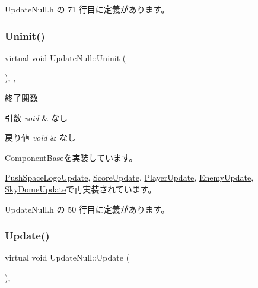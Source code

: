  Update\+Null.\+h の 71 行目に定義があります。

\mbox{\label{class_update_null_a5bd107431c5039abe13c966edb047375}} 
\subsubsection{\texorpdfstring{Uninit()}{Uninit()}}
{\footnotesize\ttfamily virtual void Update\+Null\+::\+Uninit (\begin{DoxyParamCaption}{ }\end{DoxyParamCaption})\hspace{0.3cm}{\ttfamily [inline]}, {\ttfamily [override]}, {\ttfamily [virtual]}}



終了関数 


\begin{DoxyParams}{引数}
{\em void} & なし \\
\hline
\end{DoxyParams}

\begin{DoxyRetVals}{戻り値}
{\em void} & なし \\
\hline
\end{DoxyRetVals}


\mbox{\hyperlink{class_component_base_a9f42beaf0383d6f629819579cab4de57}{Component\+Base}}を実装しています。



\mbox{\hyperlink{class_push_space_logo_update_a94f791874cb6160cd33cd7068fcde0d0}{Push\+Space\+Logo\+Update}}, \mbox{\hyperlink{class_score_update_a701d9c84c3ef92b1c54f33b37e23605f}{Score\+Update}}, \mbox{\hyperlink{class_player_update_a997e0813a825d7525da4b5b89a290168}{Player\+Update}}, \mbox{\hyperlink{class_enemy_update_a294a5d4c65551af43e933cb65036f279}{Enemy\+Update}}, \mbox{\hyperlink{class_sky_dome_update_a54da74ef017a22075ce473abe1345489}{Sky\+Dome\+Update}}で再実装されています。



 Update\+Null.\+h の 50 行目に定義があります。

\mbox{\label{class_update_null_a692f4f34e4ef35ca286a1d3606fdf473}} 
\subsubsection{\texorpdfstring{Update()}{Update()}}
{\footnotesize\ttfamily virtual void Update\+Null\+::\+Update (\begin{DoxyParamCaption}{ }\end{DoxyParamCaption})\hspace{0.3cm}{\ttfamily [inline]}, {\ttfamily [virtual]}}



